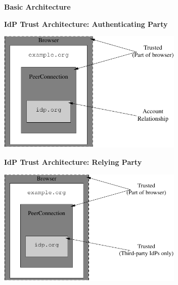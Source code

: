 \documentclass[helvetica]{seminar}
\newcommand{\heading}[1]{%
  \begin{center} 
    \large\bf 
    #1 
  \end{center} 
  \vspace{.4 in}}
\begin{document}
\begin{slide}
\heading{Basic Architecture}

\end{slide}


\begin{slide}
\heading{IdP Trust Architecture: Authenticating Party}

\begin{center}
\includegraphics[width=3.5in]{rtcweb-security-arch-idp}
\end{center}

\end{slide}

\begin{slide}
\heading{IdP Trust Architecture: Relying Party}

\begin{center}
\includegraphics[width=3.5in]{rtcweb-security-arch-idp2}
\end{center}
\end{slide}
\end{document}
